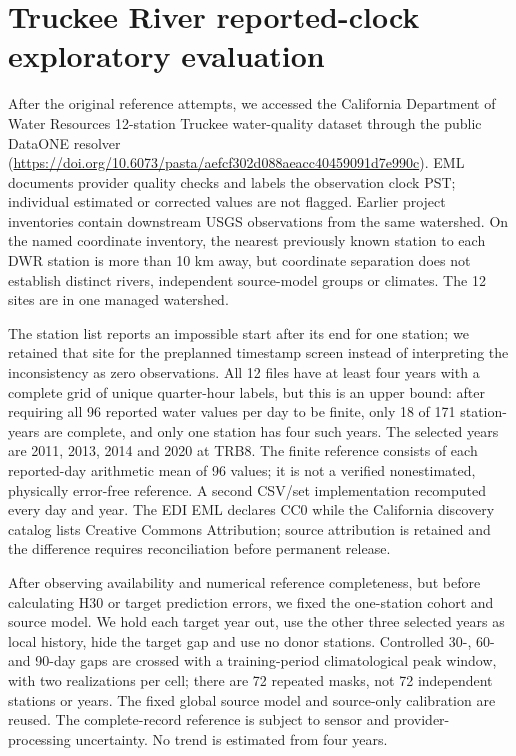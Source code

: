 \section{Truckee River reported-clock exploratory evaluation}
After the original reference attempts, we accessed the California Department of Water Resources 12-station Truckee water-quality dataset through the public DataONE resolver (\url{https://doi.org/10.6073/pasta/aefcf302d088aeacc40459091d7e990c}). EML documents provider quality checks and labels the observation clock PST; individual estimated or corrected values are not flagged. Earlier project inventories contain downstream USGS observations from the same watershed. On the named coordinate inventory, the nearest previously known station to each DWR station is more than 10 km away, but coordinate separation does not establish distinct rivers, independent source-model groups or climates. The 12 sites are in one managed watershed.

The station list reports an impossible start after its end for one station; we retained that site for the preplanned timestamp screen instead of interpreting the inconsistency as zero observations. All 12 files have at least four years with a complete grid of unique quarter-hour labels, but this is an upper bound: after requiring all 96 reported water values per day to be finite, only 18 of 171 station-years are complete, and only one station has four such years. The selected years are 2011, 2013, 2014 and 2020 at TRB8. The finite reference consists of each reported-day arithmetic mean of 96 values; it is not a verified nonestimated, physically error-free reference. A second CSV/set implementation recomputed every day and year. The EDI EML declares CC0 while the California discovery catalog lists Creative Commons Attribution; source attribution is retained and the difference requires reconciliation before permanent release.

After observing availability and numerical reference completeness, but before calculating H30 or target prediction errors, we fixed the one-station cohort and source model. We hold each target year out, use the other three selected years as local history, hide the target gap and use no donor stations. Controlled 30-, 60- and 90-day gaps are crossed with a training-period climatological peak window, with two realizations per cell; there are 72 repeated masks, not 72 independent stations or years. The fixed global source model and source-only calibration are reused. The complete-record reference is subject to sensor and provider-processing uncertainty. No trend is estimated from four years.

